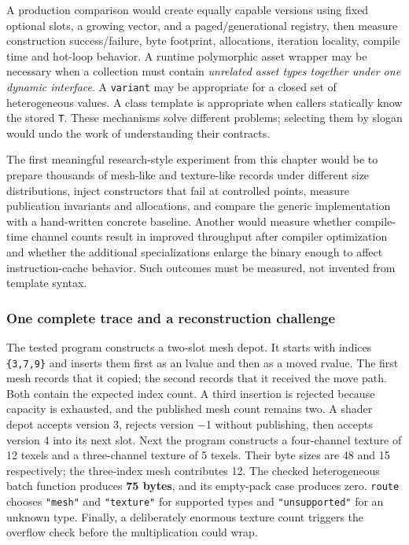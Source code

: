 A production comparison would create equally capable versions using fixed optional slots, a growing vector, and a paged/generational registry, then measure construction success/failure, byte footprint, allocations, iteration locality, compile time and hot-loop behavior. A runtime polymorphic asset wrapper may be necessary when a collection must contain \emph{unrelated asset types together under one dynamic interface}. A \texttt{variant} may be appropriate for a closed set of heterogeneous values. A class template is appropriate when callers statically know the stored \texttt{T}. These mechanisms solve different problems; selecting them by slogan would undo the work of understanding their contracts.

The first meaningful research-style experiment from this chapter would be to prepare thousands of mesh-like and texture-like records under different size distributions, inject constructors that fail at controlled points, measure publication invariants and allocations, and compare the generic implementation with a hand-written concrete baseline. Another would measure whether compile-time channel counts result in improved throughput after compiler optimization and whether the additional specializations enlarge the binary enough to affect instruction-cache behavior. Such outcomes must be measured, not invented from template syntax.

\subsubsection{One complete trace and a reconstruction challenge}\label{one-complete-trace-and-a-reconstruction-challenge}

The tested program constructs a two-slot mesh depot. It starts with indices \texttt{\{3,7,9\}} and inserts them first as an lvalue and then as a moved rvalue. The first mesh records that it copied; the second records that it received the move path. Both contain the expected index count. A third insertion is rejected because capacity is exhausted, and the published mesh count remains two. A shader depot accepts version 3, rejects version −1 without publishing, then accepts version 4 into its next slot. Next the program constructs a four-channel texture of 12 texels and a three-channel texture of 5 texels. Their byte sizes are 48 and 15 respectively; the three-index mesh contributes 12. The checked heterogeneous batch function produces \textbf{75 bytes}, and its empty-pack case produces zero. \texttt{route} chooses \texttt{"mesh"} and \texttt{"texture"} for supported types and \texttt{"unsupported"} for an unknown type. Finally, a deliberately enormous texture count triggers the overflow check before the multiplication could wrap.

